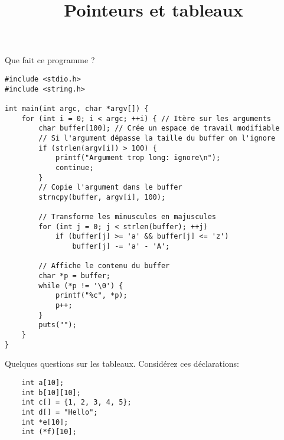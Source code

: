 \documentclass[french,a4paper,addpoints,11pt]{exam}
\title{Pointeurs et tableaux}
\begin{document}
\maketitle
\thispagestyle{headandfoot}

\begin{questions}

\question Que fait ce programme ?



\begin{solution}
\begin{lstlisting}
#include <stdio.h>
#include <string.h>

int main(int argc, char *argv[]) {
    for (int i = 0; i < argc; ++i) { // Itère sur les arguments
        char buffer[100]; // Crée un espace de travail modifiable
        // Si l'argument dépasse la taille du buffer on l'ignore
        if (strlen(argv[i]) > 100) {
            printf("Argument trop long: ignore\n");
            continue;
        }
        // Copie l'argument dans le buffer
        strncpy(buffer, argv[i], 100);

        // Transforme les minuscules en majuscules
        for (int j = 0; j < strlen(buffer); ++j)
            if (buffer[j] >= 'a' && buffer[j] <= 'z')
                buffer[j] -= 'a' - 'A';

        // Affiche le contenu du buffer
        char *p = buffer;
        while (*p != '\0') {
            printf("%c", *p);
            p++;
        }
        puts("");
    }
}
\end{lstlisting}
\end{solution}

\question Quelques questions sur les tableaux. Considérez ces déclarations:

\begin{lstlisting}
    int a[10];
    int b[10][10];
    int c[] = {1, 2, 3, 4, 5};
    int d[] = "Hello";
    int *e[10];
    int (*f)[10];
\end{lstlisting}

\end{questions}
\end{document}
